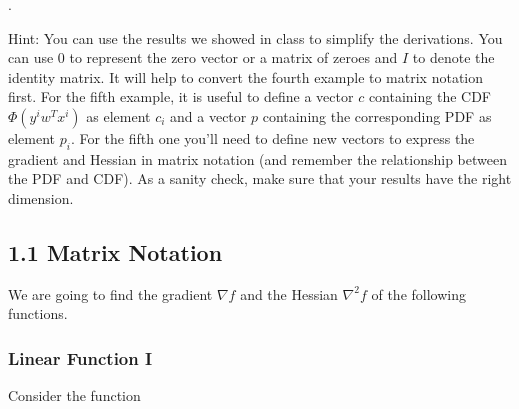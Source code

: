 \documentclass{article}
\begin{document}
.

Hint: You can use the results we showed in class to simplify the derivations. You can use $0$ to represent the zero vector or a matrix of zeroes and $I$ to denote the identity matrix. It will help to convert the fourth example to matrix notation first. For the fifth example, it is useful to define a vector $c$ containing the CDF $\Phi(y^iw^Tx^i)$ as element $c_i$ and a vector $p$ containing the corresponding PDF as element $p_i$. For the fifth one you'll need to define new vectors to express the gradient and Hessian in matrix notation (and remember the relationship between the PDF and CDF). As a sanity check, make sure that your results have the right dimension.


\subsection{1.1 Matrix Notation}
We are going to find the gradient $\nabla f$ and the Hessian $\nabla^{2} f$ of the following functions.

\subsubsection{Linear Function I}
Consider the function 
\end{document}
